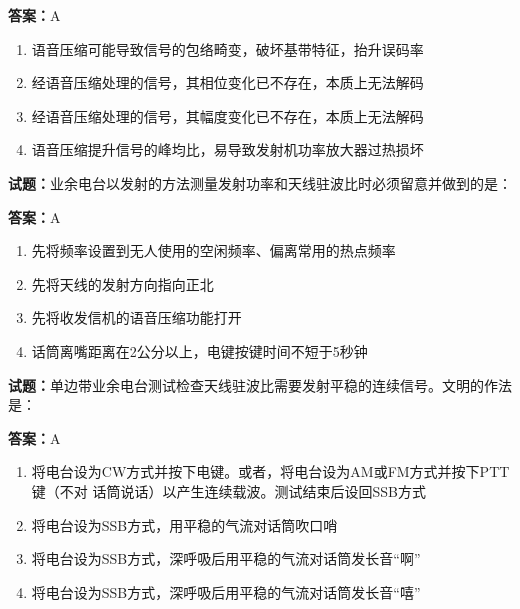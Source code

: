 \documentclass{ctexbook}
\begin{document}
\textbf{答案：}A 

\begin{enumerate}[leftmargin=3em]
  \item 语音压缩可能导致信号的包络畸变，破坏基带特征，抬升误码率 

  \item 经语音压缩处理的信号，其相位变化已不存在，本质上无法解码 

  \item 经语音压缩处理的信号，其幅度变化已不存在，本质上无法解码 

  \item 语音压缩提升信号的峰均比，易导致发射机功率放大器过热损坏 

\end{enumerate}





\vspace{1em}

\textbf{试题：}业余电台以发射的方法测量发射功率和天线驻波比时必须留意并做到的是： 

\textbf{答案：}A 

\begin{enumerate}[leftmargin=3em]
  \item 先将频率设置到无人使用的空闲频率、偏离常用的热点频率 

  \item 先将天线的发射方向指向正北 

  \item 先将收发信机的语音压缩功能打开 

  \item 话筒离嘴距离在2公分以上，电键按键时间不短于5秒钟 

\end{enumerate}





\vspace{1em}

\textbf{试题：}单边带业余电台测试检查天线驻波比需要发射平稳的连续信号。文明的作法是： 


\textbf{答案：}A 

\begin{enumerate}[leftmargin=3em]
  \item 将电台设为CW方式并按下电键。或者，将电台设为AM或FM方式并按下PTT键（不对
话筒说话）以产生连续载波。测试结束后设回SSB方式 

  \item 将电台设为SSB方式，用平稳的气流对话筒吹口哨 

  \item 将电台设为SSB方式，深呼吸后用平稳的气流对话筒发长音“啊” 

  \item 将电台设为SSB方式，深呼吸后用平稳的气流对话筒发长音“嘻” 

\end{enumerate}
\end{document}
